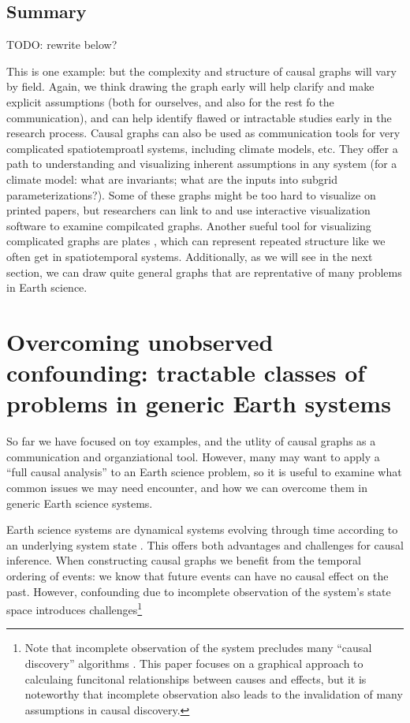\documentclass[12pt]{article}
\begin{document}
\subsection{Summary}

TODO: rewrite below?

This is one example: but the complexity and structure of causal graphs
will vary by field. Again, we think drawing the graph early will help
clarify and make explicit assumptions (both for ourselves, and also
for the rest fo the communication), and can help identify flawed or
intractable studies early in the research process. Causal graphs can
also be used as communication tools for very complicated
spatiotemproatl systems, including climate models, etc. They offer a
path to understanding and visualizing inherent assumptions in any
system (for a climate model: what are invariants; what are the inputs
into subgrid parameterizations?). Some of these graphs might be too
hard to visualize on printed papers, but researchers can link to and
use interactive visualization software to examine compilcated
graphs. Another sueful tool for visualizing complicated graphs are
plates \citep{bishop2006pattern}, which can represent repeated
structure like we often get in spatiotemporal systems. Additionally,
as we will see in the next section, we can draw quite general graphs
that are reprentative of many problems in Earth science.


\section{Overcoming unobserved confounding: tractable classes of
  problems in generic Earth systems}
\label{sec:necess-cond-caus}

So far we have focused on toy examples, and the utlity of causal
graphs as a communication and organziational tool. However, many may
want to apply a ``full causal analysis'' to an Earth science problem,
so it is useful to examine what common issues we may need encounter,
and how we can overcome them in generic Earth science systems.

Earth science systems are dynamical systems evolving through time
according to an underlying system state
\citep{lorenz-1963,lorenz1996predictability,majda-state}. This offers
both advantages and challenges for causal inference. When constructing
causal graphs we benefit from the temporal ordering of events: we know
that future events can have no causal effect on the past. However,
confounding due to incomplete observation of the system's state space
introduces challenges\footnote{Note that incomplete observation of the
  system precludes many ``causal discovery'' algorithms \citep[see ][
  for a great review]{runge2019inferring}. This paper focuses on a
  graphical approach to calculaing funcitonal relationships between
  causes and effects, but it is noteworthy that incomplete observation
  also leads to the invalidation of many assumptions in causal
  discovery.}
\end{document}
